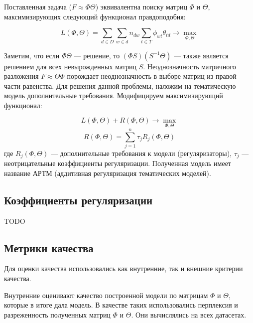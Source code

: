 \documentclass[12pt,twoside]{article}
\begin{document}
	
	Поставленная задача ($F \approx \Phi \Theta$) эквивалентна поиску матриц $\Phi$ и $\Theta$, максимизирующих следующий функционал правдоподобия:
	
	\begin{equation}\label{eq_1}
	L(\Phi, \Theta) = \sum_{d \in D} \sum_{w \in d} n_{dw} \sum_{t \in T} \phi_{wt} \theta_{td} \rightarrow \max_{\Phi, \Theta}
	\end{equation}
	
	Заметим, что если $\Phi \Theta$ --- решение, то $(\Phi S ) (S^{-1}\Theta)$ --- также является решением для всех невырожденных матриц $S$. Неоднозначность матричного разложения  $F \approx \Theta \Phi$ порождает неоднозначность в
	выборе матриц из правой части равенства. Для решения данной проблемы, наложим
	на тематическую модель дополнительные требования. Модифицируем максимизирующий функционал:
	
	\begin{equation}
	L(\Phi, \Theta) + R(\Phi, \Theta) \rightarrow \max_{\Phi, \Theta}
	\end{equation}	
	\begin{equation}	
	R(\Phi, \Theta) = \sum_{j=1}^{n} \tau_j R_j(\Phi, \Theta)
	\end{equation}
	где $R_j(\Phi, \Theta)$ --- дополнительные требования к модели (регуляризаторы),  $\tau_j$ --- неотрицательные коэффициенты регуляризации. Полученная модель имеет название АРТМ (аддитивная регуляризация тематических моделей).
	
	\subsection{Коэффициенты регуляризации} \label{subsec:coefs}
	
	{\Huge TODO}
	
	\subsection{Метрики качества}
	
	Для оценки качества использовались как внутренние, так и внешние критерии качества.
	
	Внутренние оценивают качество построенной модели по матрицам $\Phi$ и $\Theta$, которые в итоге дала модель.
	В качестве таких использовались перплексия и разреженность полученных матриц $\Phi$ и $\Theta$. Они вычислялись на всех датасетах.
	
\end{document}
